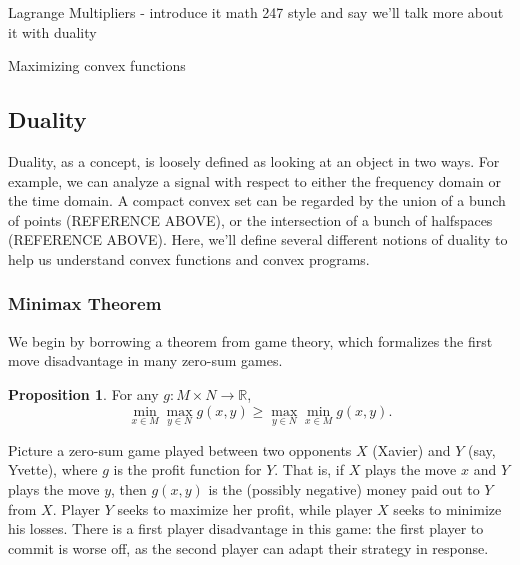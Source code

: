 \documentclass{article}
\numberwithin{equation}{section}
\theoremstyle{definition}
\newtheorem{proposition}[theorem]{Proposition}
\newcommand{\bR}{\mathbb{R}}
\begin{document}
Lagrange Multipliers - introduce it math 247 style and say we'll talk more about it with duality

Maximizing convex functions
\subsection{Duality}
Duality, as a concept, is loosely defined as looking at an object in two ways. For example, we can analyze a signal with respect to either the frequency domain or the time domain. A compact convex set can be regarded by the union of a bunch of points (REFERENCE ABOVE), or the intersection of a bunch of halfspaces (REFERENCE ABOVE). Here, we'll define several different notions of duality to help us understand convex functions and convex programs.
\subsubsection{Minimax Theorem}
We begin by borrowing a theorem from game theory, which formalizes the first move disadvantage in many zero-sum games.
\begin{proposition}
    \label{prpweakduality}
    For any $g:M\times N\to\bR$,
    \begin{equation}
    \label{prpweakdualityeq}
        \min_{x\in M}\max_{y\in N} g(x,y)\ge \max_{y\in N}\min_{x\in M} g(x,y).
    \end{equation}
\end{proposition}
Picture a zero-sum game played between two opponents $X$ (Xavier) and $Y$ (say, Yvette), where $g$ is the profit function for $Y$. That is, if $X$ plays the move $x$ and $Y$ plays the move $y$, then $g(x,y)$ is the (possibly negative) money paid out to $Y$ from $X$. Player $Y$ seeks to maximize her profit, while player $X$ seeks to minimize his losses. There is a first player disadvantage in this game: the first player to commit is worse off, as the second player can adapt their strategy in response.
\end{document}
